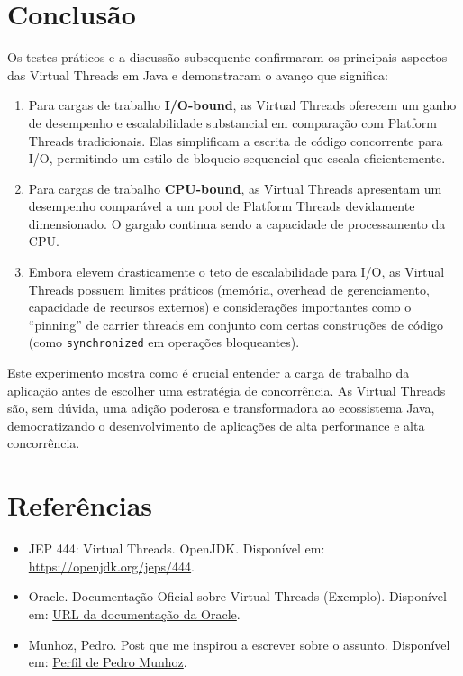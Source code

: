 \documentclass[12pt,a4paper]{article}
\newcommand{\linkedinPedroMunhoz}{https://www.linkedin.com/in/pedro-munhoz-675847222}
\begin{document}
\section{Conclusão}
Os testes práticos e a discussão subsequente confirmaram os principais aspectos das Virtual Threads em Java e demonstraram o avanço que significa:
\begin{enumerate}
    \item Para cargas de trabalho \textbf{I/O-bound}, as Virtual Threads oferecem um ganho de desempenho e escalabilidade substancial em comparação com Platform Threads tradicionais. Elas simplificam a escrita de código concorrente para I/O, permitindo um estilo de bloqueio sequencial que escala eficientemente.
    \item Para cargas de trabalho \textbf{CPU-bound}, as Virtual Threads apresentam um desempenho comparável a um pool de Platform Threads devidamente dimensionado. O gargalo continua sendo a capacidade de processamento da CPU.
    \item Embora elevem drasticamente o teto de escalabilidade para I/O, as Virtual Threads possuem limites práticos (memória, overhead de gerenciamento, capacidade de recursos externos) e considerações importantes como o ``pinning'' de carrier threads em conjunto com certas construções de código (como \texttt{synchronized} em operações bloqueantes).
\end{enumerate}
Este experimento mostra como é crucial entender a carga de trabalho da aplicação antes de escolher uma estratégia de concorrência. As Virtual Threads são, sem dúvida, uma adição poderosa e transformadora ao ecossistema Java, democratizando o desenvolvimento de aplicações de alta performance e alta concorrência.


\section*{Referências}
\begin{itemize}
    \item JEP 444: Virtual Threads. OpenJDK. Disponível em: \href{https://openjdk.org/jeps/444}{https://openjdk.org/jeps/444}.
    \item Oracle. Documentação Oficial sobre Virtual Threads (Exemplo). Disponível em: \href{https://docs.oracle.com/en/java/javase/21/core/virtual-threads.html}{URL da documentação da Oracle}.
    \item Munhoz, Pedro. Post que me inspirou a escrever sobre o assunto. Disponível em: \href{\linkedinPedroMunhoz}{Perfil de Pedro Munhoz}.
\end{itemize}
\end{document}
